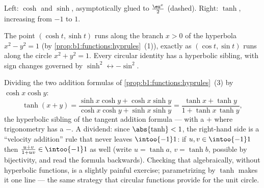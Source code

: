 \begin{omfigure}

{\small Left: $\cosh$ and $\sinh$, asymptotically glued to
$\frac{\eu^x}{2}$ (dashed). Right: $\tanh$, increasing from $-1$ to
$1$.}
\end{omfigure}

\begin{remark}
The point $(\cosh t, \sinh t)$ runs along the branch $x > 0$ of the
hyperbola $x^2 - y^2 = 1$ (by
\cref{prop:b1:functions:hyprules}~(1)), exactly as $(\cos t, \sin
t)$ runs along the circle $x^2 + y^2 = 1$. Every circular identity has
a hyperbolic sibling, with sign changes governed by
$\sinh^2 \leftrightarrow -\sin^2$.
\end{remark}

\begin{example}\label{ex:b1:functions:tanhadd}
Dividing the two addition formulas of
\cref{prop:b1:functions:hyprules}~(3) by $\cosh x\cosh y$:
\[
\tanh(x + y)
= \frac{\sinh x\cosh y + \cosh x\sinh y}
{\cosh x\cosh y + \sinh x\sinh y}
= \frac{\tanh x + \tanh y}{1 + \tanh x\,\tanh y} ,
\]
the hyperbolic sibling of the tangent addition formula --- with a
$+$ where trigonometry has a $-$. A dividend: since $\abs{\tanh}
< 1$, the right-hand side is a ``velocity addition'' rule that
never leaves $\intoo{-1}1$: if $u, v \in \intoo{-1}1$ then
$\frac{u + v}{1 + uv} \in \intoo{-1}1$ as well (write $u = \tanh
a$, $v = \tanh b$, possible by bijectivity, and read the formula
backwards). Checking that algebraically, without hyperbolic
functions, is a slightly painful exercise; parametrizing by
$\tanh$ makes it one line --- the same strategy that circular
functions provide for the unit circle.
\end{example}

